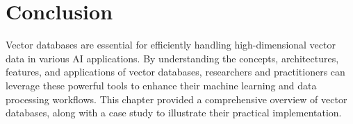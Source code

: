 \section{Conclusion}
Vector databases are essential for efficiently handling high-dimensional vector data in various AI applications. By understanding the concepts, architectures, features, and applications of vector databases, researchers and practitioners can leverage these powerful tools to enhance their machine learning and data processing workflows. This chapter provided a comprehensive overview of vector databases, along with a case study to illustrate their practical implementation.


% 
% 